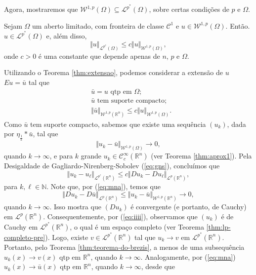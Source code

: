 \documentclass[a4paper, 11pt]{book}
\theoremstyle{definition}
\newcommand{\bN}{\mathbb{N}}
\newcommand{\bR}{\mathbb{R}}
\newcommand{\cC}{\mathcal{C}}
\newcommand{\cL}{\mathcal{L}}
\newcommand{\cW}{\mathcal{W}}
\begin{document}
Agora, mostraremos que $\cW^{1,p}(\Omega) \subseteq \cL^{p^*}(\Omega)$, sobre certas condições de $p$ e $\Omega$.

\begin{tbox} \label{thm:desigualdade-teorema-2}
    Sejam $\Omega$ um aberto limitado, com fronteira de classe $\cC^1$ e $u \in \cW^{1,p}(\Omega)$. Então. $u \in \cL^{p^*}(\Omega)$ e, além disso,
    \[
        \Vert u \Vert_{\cL^{p^*}(\Omega)} \leqslant c \Vert u \Vert_{\cW^{1,p}(\Omega)},
    \]
    onde $c > 0$ é uma constante que depende apenas de $n$, $p$ e $\Omega$.
\end{tbox}
\begin{prf}
    Utilizando o Teorema \ref{thm:extensao}, podemos considerar a extensão de $u$ $Eu = \bar u$ tal que
    \begin{equation} \label{eq:man}
        \begin{aligned}
            &\bar u = u \text{ qtp em } \Omega;\\
            &\bar u \text{ tem suporte compacto};\\
            &\Vert \bar u \Vert_{\cW^{1,p}(\bR^n)} \leqslant c\Vert u \Vert_{\cW^{1,p}(\Omega)}.
        \end{aligned}
    \end{equation}
    Como $\bar u$ tem suporte compacto, sabemos que existe uma sequência $(u_k)$, dada por $\eta_{\frac{1}{k}} * \bar u$, tal que
    \begin{equation} \label{eq:mna}
        \Vert u_k - \bar u \Vert_{\cW^{1,p}(\Omega)} \to 0,
    \end{equation}
    quando $k \to \infty$,
    e para $k$ grande $u_k \in \cC^{\infty}_c(\bR^n)$ (ver Teorema \ref{thm:aprox1}).
    Pela Desigaldade de Gagliardo-Nirenberg-Sobolev (\ref{eq:gns}), concluímos que
    \begin{equation} \label{eq:iiii}
        \Vert u_k - u_\ell \Vert_{\cL^{p^*}(\bR^n)} \leqslant c \Vert Du_k - Du_\ell \Vert_{\cL^p(\bR^n)},
    \end{equation}
    para $k, \ell \in \bN$.
    Note que, por (\ref{eq:mna}), temos que
    \begin{equation} \label{eq:jjj}
        \Vert Du_k - D\bar u \Vert_{\cL^p(\bR^n)} \leqslant \Vert u_k - \bar u \Vert_{\cW^{1,p}(\bR^n)} \to 0, 
    \end{equation}
    quando $k \to \infty$.
    Isso mostra que $(Du_k)$ é convergente (e portanto, de Cauchy) em $\cL^p(\bR^n)$.
    Consequentemente, por (\ref{eq:iiii}), observamos que $(u_k)$ é de Cauchy em $\cL^{p^*}(\bR^n)$, o qual é um espaço completo (ver Teorema \ref{thm:lp-completo-pre}). Logo, existe $v \in \cL^{p^*}(\bR^n)$ tal que $u_k \to v$ em $\cL^{p^*}(\bR^n)$. Portanto, pelo Teorema \ref{thm:teorema-do-brezis}, a menos de uma subsequência $u_k(x) \to v(x)$ qtp em $\bR^n$, quando $k \to \infty$. Analogamente, por (\ref{eq:mna}) $u_k(x) \to \bar u(x)$ qtp em $\bR^n$, quando $k \to \infty$, desde que

\end{prf}
\end{document}
